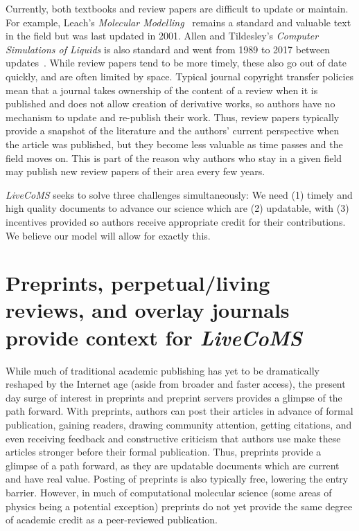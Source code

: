 \documentclass[9pt,editorial]{livecoms}
\begin{document}
Currently, both textbooks and review papers are difficult to update or maintain.
For example, Leach's \emph{Molecular Modelling}~\cite{Leach:2001:} remains a standard and valuable text in the field but was last updated in 2001.
Allen and Tildesley's \emph{Computer Simulations of Liquids} is also standard and went from 1989 to 2017 between updates~\cite{allen_computer_2017}. 
While review papers tend to be more timely, these also go out of date quickly, and are often limited by space. 
Typical journal copyright transfer policies mean that a journal takes ownership of the content of a review when it is published and does not allow creation of derivative works, so authors have no mechanism to update and re-publish their work.
Thus, review papers typically provide a snapshot of the literature and the authors' current perspective when the article was published, but they become less valuable as time passes and the field moves on.
This is part of the reason why authors who stay in a given field may publish new review papers of their area every few years. 

\emph{LiveCoMS} seeks to solve three challenges simultaneously: We need (1) timely and high quality documents to advance our science which are (2) updatable, with (3) incentives provided so authors receive appropriate credit for their contributions.
We believe our model will allow for exactly this. 

\section{Preprints, perpetual/living reviews, and overlay journals provide context for \emph{LiveCoMS}}

While much of traditional academic publishing has yet to be dramatically reshaped by the Internet age (aside from broader and faster access), the present day surge of interest in preprints and preprint servers provides a glimpse of the path forward.
With preprints, authors can post their articles in advance of formal publication, gaining readers, drawing community attention, getting citations, and even receiving feedback and constructive criticism that authors use make these articles stronger before their formal publication.
Thus, preprints provide a glimpse of a path forward, as they are updatable documents which are current and have real value.
Posting of preprints is also typically free, lowering the entry barrier. 
However, in much of computational molecular science (some areas of physics being a potential exception) preprints do not yet provide the same degree of academic credit as a peer-reviewed publication. 
\end{document}
